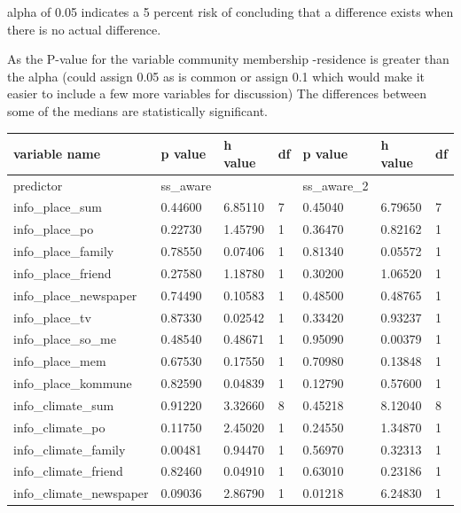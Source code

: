 alpha of 0.05 indicates a 5 percent
risk of concluding that a difference exists when there is no actual difference.

As the P-value for the variable community membership -residence is greater than the alpha (could assign 0.05 as is common or assign 0.1 which would make it easier to include a few more variables for discussion) The differences between some of the medians are statistically significant.

\begin{table}[h]
    \centering
    \begin{tabular}{|l|l|l|l|l|l|l|}
    \hline
        variable name & p value & h value & df & p value & h value & df \\ \hline
        predictor & ss\_aware & ~ & ~ & ss\_aware\_2 & ~ & ~ \\ \hline
        info\_place\_sum & 0.44600 & 6.85110 & 7 & 0.45040 & 6.79650 & 7 \\ \hline
        info\_place\_po & 0.22730 & 1.45790 & 1 & 0.36470 & 0.82162 & 1 \\ \hline
        info\_place\_family & 0.78550 & 0.07406 & 1 & 0.81340 & 0.05572 & 1 \\ \hline
        info\_place\_friend & 0.27580 & 1.18780 & 1 & 0.30200 & 1.06520 & 1 \\ \hline
        info\_place\_newspaper & 0.74490 & 0.10583 & 1 & 0.48500 & 0.48765 & 1 \\ \hline
        info\_place\_tv & 0.87330 & 0.02542 & 1 & 0.33420 & 0.93237 & 1 \\ \hline
        info\_place\_so\_me & 0.48540 & 0.48671 & 1 & 0.95090 & 0.00379 & 1 \\ \hline
        info\_place\_mem & 0.67530 & 0.17550 & 1 & 0.70980 & 0.13848 & 1 \\ \hline
        info\_place\_kommune & 0.82590 & 0.04839 & 1 & 0.12790 & 0.57600 & 1 \\ \hline
        info\_climate\_sum & 0.91220 & 3.32660 & 8 & 0.45218 & 8.12040 & 8 \\ \hline
        info\_climate\_po & 0.11750 & 2.45020 & 1 & 0.24550 & 1.34870 & 1 \\ \hline
        info\_climate\_family & \cellcolor[HTML]{7df9ff} 0.00481 & 0.94470 & 1 & 0.56970 & 0.32313 & 1 \\ \hline
        info\_climate\_friend & 0.82460 & 0.04910 & 1 & 0.63010 & 0.23186 & 1 \\ \hline
        info\_climate\_newspaper & 0.09036 & 2.86790 & 1 & \cellcolor[HTML]{7df9ff} 0.01218 & 6.24830 & 1 \\ \hline

\end{tabular}
\end{table}
